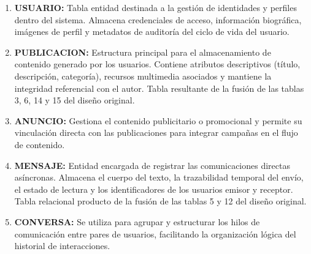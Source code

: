 \begin{enumerate}
    \item \textbf{USUARIO:} Tabla entidad destinada a la gestión de identidades y perfiles dentro del sistema. Almacena credenciales de acceso, información biográfica, imágenes de perfil y metadatos de auditoría del ciclo de vida del usuario. 
    
    \item \textbf{PUBLICACION:} Estructura principal para el almacenamiento de contenido generado por los usuarios. Contiene atributos descriptivos (título, descripción, categoría), recursos multimedia asociados y mantiene la integridad referencial con el autor. Tabla resultante de la fusión de las tablas 3, 6, 14 y 15 del diseño original.
    
    \item \textbf{ANUNCIO:} Gestiona el contenido publicitario o promocional y permite su vinculación directa con las publicaciones para integrar campañas en el flujo de contenido.
    
    \item \textbf{MENSAJE:} Entidad encargada de registrar las comunicaciones directas asíncronas. Almacena el cuerpo del texto, la trazabilidad temporal del envío, el estado de lectura y los identificadores de los usuarios emisor y receptor. Tabla relacional producto de la fusión de las tablas 5 y 12 del diseño original.
    
    \item \textbf{CONVERSA:} Se utiliza para agrupar y estructurar los hilos de comunicación entre pares de usuarios, facilitando la organización lógica del historial de interacciones.
\end{enumerate}

